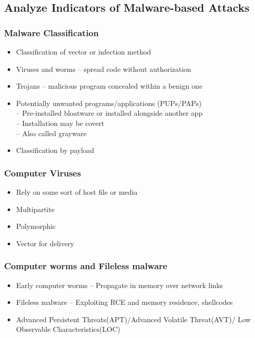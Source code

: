 	\subsection {Analyze Indicators of Malware-based Attacks}
		\subsubsection {Malware Classification}
			\begin{itemize}
				\item Classification of vector or infection method
				\item Viruses and worms -- spread code without authorization
				\item Trojans -- malicious program concealed within a benign one
				\item Potentially unwanted programs/applications (PUPs/PAPs) \\
					-- Pre-installed bloatware or installed alongside another app \\
					-- Installation may be covert \\
					-- Also called grayware
				\item Classification by payload	
			\end{itemize}
		\subsubsection {Computer Viruses}
			\begin{itemize}
				\item Rely on some sort of host file or media
				\item Multipartite
				\item Polymorphic
				\item Vector for delivery
			\end{itemize}
		\subsubsection {Computer worms and Fileless malware}
			\begin{itemize}
				\item Early computer worms -- Propagate in memory over network links
				\item Fileless malware -- Exploiting RCE and memory residence, shellcodes
				\item Advanced Persistent Threats(APT)/Advanced Volatile Threat(AVT)/
					Low Observable Characteristics(LOC)
			\end{itemize}
